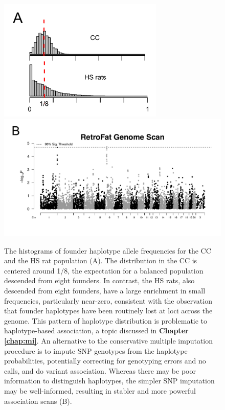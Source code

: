 \begin{figure}
\centering
\includegraphics[width=0.7\textwidth, trim={0in 0.1in 0in 0in}, clip]{figures/1-introduction/hs_part1.pdf}
\includegraphics[width=\textwidth, trim={0in 0.4in 0in 0in}, clip]{figures/1-introduction/hs_part2.pdf}
\caption[Example of HS rat analysis]{The histograms of founder haplotype allele frequencies for the CC and the HS rat population (A). The distribution in the CC is centered around 1/8, the expectation for a balanced population descended from eight founders. In contrast, the HS rats, also descended from eight founders, have a large enrichment in small frequencies, particularly near-zero, consistent with the observation that founder haplotypes have been routinely lost at loci across the genome. This pattern of haplotype distribution is problematic to haplotype-based association, a topic discussed in \textbf{Chapter \ref{chap:mi}}. An alternative to the conservative multiple imputation procedure is to impute SNP genotypes from the haplotype probabilities, potentially correcting for genotyping errors and no calls, and do variant association. Whereas there may be poor information to distinguish haplotypes, the simpler SNP imputation may be well-informed, resulting in stabler and more powerful association scans (B). \label{fig:hs_example}}
\end{figure}

